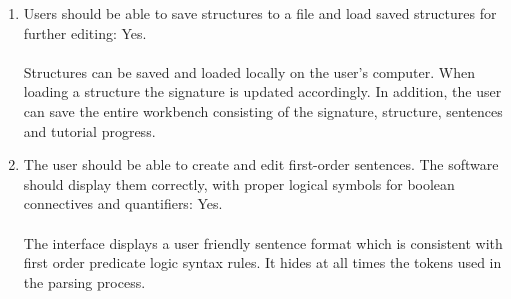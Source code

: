 \documentclass{report}
\begin{document}
\begin{enumerate}
\item Users should be able to save structures to a file and load saved 
structures for further editing: Yes.
\\ \\
Structures can be saved and loaded locally on the user's computer. When loading 
a structure the signature is updated accordingly. In addition, the user can save 
the entire workbench consisting of the signature, structure, sentences and 
tutorial progress. 

\item The user should be able to create and edit first-order sentences. The 
software should display them correctly, with proper logical symbols for boolean 
connectives and quantifiers: Yes.
\\ \\
The interface displays a user friendly sentence format which is consistent with 
first order predicate logic syntax rules. It hides at all times the tokens used 
in the parsing process. 


\end{enumerate}
\end{document}
